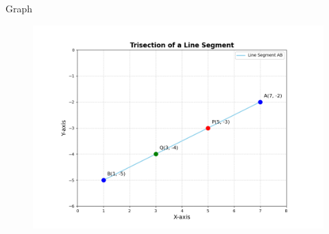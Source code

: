 \documentclass{beamer}
\begin{document}
\begin{frame}{Graph}
    \begin{figure}
        \centering
        \includegraphics[width=\columnwidth]{figs/trisection_plot.png}
    \end{figure}
\end{frame}
\end{document}
